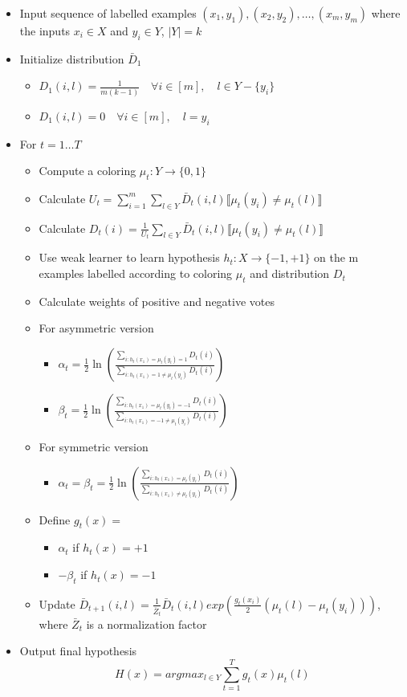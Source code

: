 \documentclass[11pt]{article}
\begin{document}
\begin{itemize}
\item Input sequence of labelled examples $(x_1, y_1), (x_2, y_2), \ldots, (x_m, y_m)$ where the inputs $x_i \in X$ and $y_i \in Y$, $|Y| = k$
\item Initialize distribution $\bar D_1$
\begin{itemize}
\item $D_1(i, l) = \frac{1}{m(k-1)}\quad \forall i \in [m],\quad l \in Y - \{y_i\}$
\item $D_1(i, l) = 0 \quad \forall i \in [m],\quad l = y_i$
\end{itemize}
\item For $t =  1 \ldots T$
\begin{itemize}
\item Compute a coloring $\mu_t : Y \rightarrow \{0,1\}$
\item Calculate $U_t = \sum_{i=1}^m \sum_{l \in Y} \bar D_t(i,l) \llbracket \mu_t(y_i) \neq \mu_t(l)\rrbracket$
\item Calculate $D_t(i) = \frac{1}{U_t} \sum_{l \in Y} \bar D_t(i,l) \llbracket \mu_t(y_i) \neq \mu_t(l)\rrbracket$
\item Use weak learner to learn hypothesis $h_t : X \rightarrow \{-1,+1\}$ on the m examples labelled according to coloring $\mu_t$ and distribution $D_t$
\item Calculate weights of positive and negative votes
\item For asymmetric version
\begin{itemize}
\item $\alpha_t = \frac{1}{2} \ln \left(\frac{\sum_{i:h_t(x_1) = \mu_t(y_i) = 1} D_t(i)}{\sum_{i:h_t(x_1) = 1 \neq \mu_t(y_i) } D_t(i)} \right)$
\item $\beta_t = \frac{1}{2} \ln \left(\frac{\sum_{i:h_t(x_1) = \mu_t(y_i) = -1} D_t(i)}{\sum_{i:h_t(x_1) = -1 \neq \mu_t(y_i) } D_t(i)} \right)$
\end{itemize}
\item For symmetric version
\begin{itemize}
\item $\alpha_t = \beta_t = \frac{1}{2} \ln \left(\frac{\sum_{i:h_t(x_1) = \mu_t(y_i)} D_t(i)}{\sum_{i:h_t(x_1) \neq \mu_t(y_i) } D_t(i)} \right)$
\end{itemize}
\item Define $g_t(x) = $
\begin{itemize}
\item $\alpha_t$ if $h_t(x) = +1$
\item $-\beta_t$ if $h_t(x) = -1$
\end{itemize}
\item Update $\bar D_{t+1}(i,l) = \frac{1}{\bar Z_t} \bar D_t(i,l) exp(\frac{g_t(x_i)}{2}(\mu_t(l)-\mu_t(y_i)))$, where $\bar Z_t$ is a normalization factor
\end{itemize}
\item Output final hypothesis $$H(x) = argmax_{l \in Y} \sum_{t=1}^T g_t(x)\mu_t(l)$$
\end{itemize}
\end{document}
